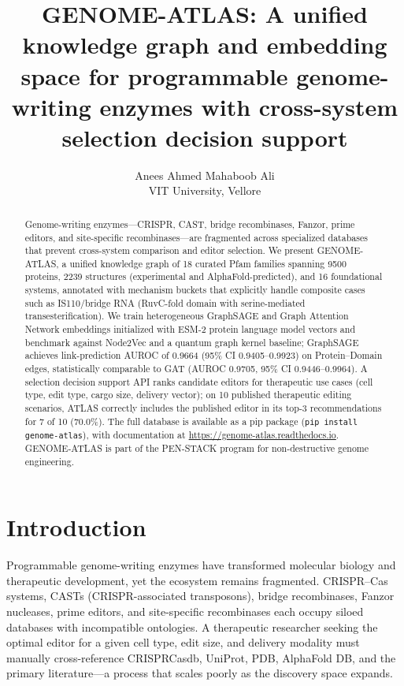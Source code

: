 \documentclass[11pt,a4paper]{article}
\title{GENOME-ATLAS: A unified knowledge graph and embedding space for programmable genome-writing enzymes with cross-system selection decision support}
\author{Anees Ahmed Mahaboob Ali\\ VIT University, Vellore}
\date{}
\begin{document}
\maketitle

\begin{abstract}
Genome-writing enzymes---CRISPR, CAST, bridge recombinases, Fanzor, prime editors, and site-specific recombinases---are fragmented across specialized databases that prevent cross-system comparison and editor selection. We present GENOME-ATLAS, a unified knowledge graph of 18 curated Pfam families spanning \num{9500} proteins, \num{2239} structures (experimental and AlphaFold-predicted), and 16 foundational systems, annotated with mechanism buckets that explicitly handle composite cases such as IS110/bridge RNA (RuvC-fold domain with serine-mediated transesterification). We train heterogeneous GraphSAGE and Graph Attention Network embeddings initialized with ESM-2 protein language model vectors and benchmark against Node2Vec and a quantum graph kernel baseline; GraphSAGE achieves link-prediction AUROC of 0.9664 (95\% CI 0.9405--0.9923) on Protein--Domain edges, statistically comparable to GAT (AUROC 0.9705, 95\% CI 0.9446--0.9964). A selection decision support API ranks candidate editors for therapeutic use cases (cell type, edit type, cargo size, delivery vector); on 10 published therapeutic editing scenarios, ATLAS correctly includes the published editor in its top-3 recommendations for 7 of 10 (70.0\%). The full database is available as a pip package (\texttt{pip install genome-atlas}), with documentation at \url{https://genome-atlas.readthedocs.io}. GENOME-ATLAS is part of the PEN-STACK program for non-destructive genome engineering.
\end{abstract}

\section*{Introduction}

Programmable genome-writing enzymes have transformed molecular biology and therapeutic development, yet the ecosystem remains fragmented. CRISPR--Cas systems, CASTs (CRISPR-associated transposons), bridge recombinases, Fanzor nucleases, prime editors, and site-specific recombinases each occupy siloed databases with incompatible ontologies. A therapeutic researcher seeking the optimal editor for a given cell type, edit size, and delivery modality must manually cross-reference CRISPRCasdb, UniProt, PDB, AlphaFold DB, and the primary literature---a process that scales poorly as the discovery space expands.
\end{document}
